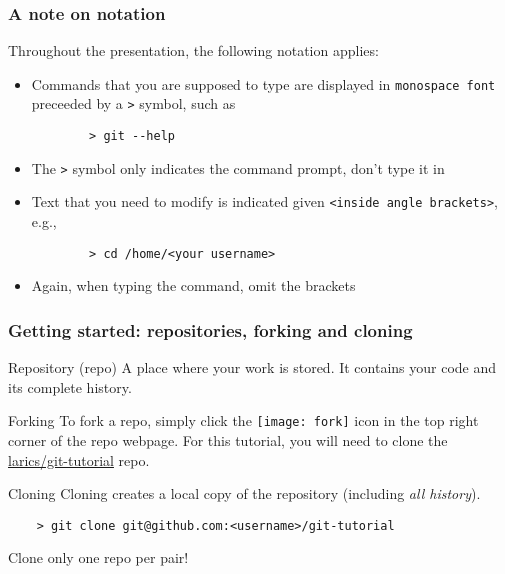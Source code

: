 
\begin{frame}[fragile]
	\frametitle{A note on notation}
	
	Throughout the presentation, the following notation applies:
	\begin{itemize}
		\item Commands that you are supposed to type are displayed in \texttt{monospace font} preceeded by a \texttt{>} symbol, such as
		\begin{verbatim}
		> git --help
		\end{verbatim}
		\item The \texttt{>} symbol only indicates the command prompt, don't type it in
		\item Text that you need to modify is indicated given \texttt{<inside angle brackets>}, e.g.,
		\begin{verbatim}
		> cd /home/<your username>
		\end{verbatim}
		\item Again, when typing the command, omit the brackets
	\end{itemize}
\end{frame}


\begin{frame}[fragile]
	\frametitle{Getting started: repositories, forking and cloning}

	\begin{block}{Repository (repo)}
	A place where your work is stored. It contains your code and its complete history. 
	\end{block}

	\begin{block}{Forking}
	To fork a repo, simply click the \texttt{[image: fork]} icon in the top right corner of the repo webpage. For this tutorial, you will need to clone the \href{https://github.com/larics/git-tutorial}{larics/git-tutorial} repo.
	\end{block}

	\begin{block}{Cloning}
	Cloning creates a local copy of the repository (including \emph{all history}).	
	\begin{verbatim}
	> git clone git@github.com:<username>/git-tutorial
	\end{verbatim}
	Clone only one repo per pair!
	\end{block}
\end{frame}
	
